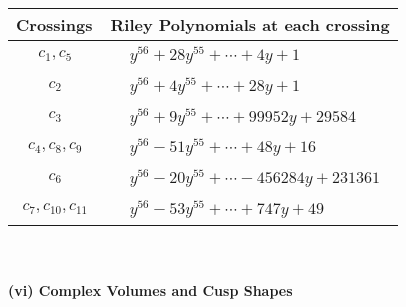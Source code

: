 \documentclass[1p]{elsarticle_modified}
\theoremstyle{definition}
\begin{document}
\begin{tabular}{m{50pt}|m{274pt}}
Crossings & \hspace{64pt}Riley Polynomials at each crossing \\
\hline $$\begin{aligned}c_{1},c_{5}\end{aligned}$$&$\begin{aligned}
&y^{56}+28 y^{55}+\cdots+4 y+1
\end{aligned}$\\
\hline $$\begin{aligned}c_{2}\end{aligned}$$&$\begin{aligned}
&y^{56}+4 y^{55}+\cdots+28 y+1
\end{aligned}$\\
\hline $$\begin{aligned}c_{3}\end{aligned}$$&$\begin{aligned}
&y^{56}+9 y^{55}+\cdots+99952 y+29584
\end{aligned}$\\
\hline $$\begin{aligned}c_{4},c_{8},c_{9}\end{aligned}$$&$\begin{aligned}
&y^{56}-51 y^{55}+\cdots+48 y+16
\end{aligned}$\\
\hline $$\begin{aligned}c_{6}\end{aligned}$$&$\begin{aligned}
&y^{56}-20 y^{55}+\cdots-456284 y+231361
\end{aligned}$\\
\hline $$\begin{aligned}c_{7},c_{10},c_{11}\end{aligned}$$&$\begin{aligned}
&y^{56}-53 y^{55}+\cdots+747 y+49
\end{aligned}$\\
\hline
\end{tabular}\\~\\
\newpage\flushleft \textbf{(vi) Complex Volumes and Cusp Shapes}
\end{document}
